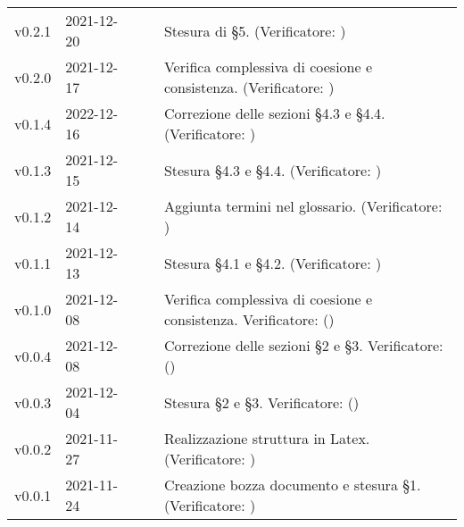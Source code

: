 \begin{longtable}{ m{}<{\centering}  m{}<{\centering}  m{}<{\centering}  m{}<{\centering}  m{}<{\centering} }
	v0.2.1& 2021-12-20 & \EP{} & \AM{} & Stesura di §5. (Verificatore: \textit{\MG})\\

	v0.2.0& 2021-12-17 & \EP{} & \AM{} & Verifica complessiva di coesione e consistenza. (Verificatore: \textit{\MG})\\	
	
	v0.1.4& 2022-12-16 & \MB{} & \AM{} & Correzione delle sezioni §4.3 e §4.4. (Verificatore: \textit{\MG})\\
	
	v0.1.3& 2021-12-15 & \MB{} & \AM{} & Stesura §4.3 e §4.4. (Verificatore: \textit{\MG})\\

	v0.1.2& 2021-12-14 & \EP{} & \AM{} & Aggiunta termini nel glossario. (Verificatore: \textit{\MG})\\

	v0.1.1& 2021-12-13 & \MB{} & \AM{} & Stesura §4.1 e §4.2. (Verificatore: \textit{\MG})\\

	v0.1.0& 2021-12-08 & \MB{} & \AM{} & Verifica complessiva di coesione e consistenza. Verificatore: (\textit{\FP}) \\	

	v0.0.4& 2021-12-08 & \MB{} & \AM{} & Correzione delle sezioni §2 e §3. Verificatore: (\textit{\FP}) \\

	v0.0.3& 2021-12-04 & \MB{} & \AM{} & Stesura §2 e §3. Verificatore: (\textit{\FP}) \\

	v0.0.2& 2021-11-27 & \EP{} & \AM{} & Realizzazione struttura in Latex. (Verificatore: \textit{\FP})\\

	v0.0.1& 2021-11-24 & \MB{} & \RE{} & Creazione bozza documento e stesura §1. (Verificatore: \textit{\FP}) \\

\end{longtable}

\pagebreak
